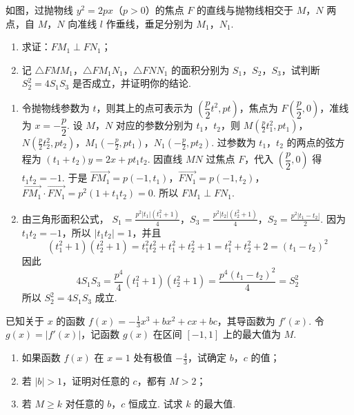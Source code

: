 \begin{problem}
如图，过抛物线 \( y^{2} = 2px \)（\(p > 0\)）的焦点 \(F\) 的直线与抛物线相交于 \(M\)，\(N\) 两点，自 \(M\)，\(N\) 向准线 \( l \) 作垂线，垂足分别为 \(M_{1}\)，\(N_{1}\).

\begin{enumerate}
\item 求证：\( FM_{1} \perp FN_{1} \)；
\item 记 \(\triangle FMM_{1}\)，\(\triangle FM_{1}N_{1}\)，\(\triangle FNN_{1}\) 的面积分别为 \(S_{1}\)，\(S_{2}\)，\(S_{3}\)，试判断 \(S_{2}^{2} = 4S_{1}S_{3}\) 是否成立，并证明你的结论.
\end{enumerate}

\end{problem}

\begin{solution}
\begin{enumerate}
\item 令抛物线参数为 \(t\)，则其上的点可表示为 \(\left(\dfrac{p}{2}t^2,pt\right)\)，焦点为 \(F\left(\dfrac{p}{2},0\right)\)，准线为 \(x=-\dfrac{p}{2}\). 设 \(M\)，\(N\) 对应的参数分别为 \(t_1\)，\(t_2\)，则
\(M\left(\frac{p}{2}t_1^2,pt_1\right)\)，\(N\left(\frac{p}{2}t_2^2,pt_2\right)\)，\(M_1\left(-\frac{p}{2},pt_1\right)\)，\(N_1\left(-\frac{p}{2},pt_2\right)\).
过参数为 \(t_1\)，\(t_2\) 的两点的弦方程为 \((t_1+t_2)y=2x+pt_1t_2\). 因直线 \(MN\) 过焦点 \(F\)，代入 \(\left(\dfrac{p}{2},0\right)\) 得 \(t_1t_2=-1\). 于是
\(\overrightarrow{FM_1}=p(-1,t_1)\)，\(\overrightarrow{FN_1}=p(-1,t_2)\)，\(\overrightarrow{FM_1}\cdot\overrightarrow{FN_1}=p^2(1+t_1t_2)=0\).
所以 \(FM_1\perp FN_1\).
\item 由三角形面积公式，
\(S_1=\frac{p^2|t_1|(t_1^2+1)}{4}\)，\(S_3=\frac{p^2|t_2|(t_2^2+1)}{4}\)，\(S_2=\frac{p^2|t_1-t_2|}{2}\).
因为 \(t_1t_2=-1\)，所以 \(|t_1t_2|=1\)，并且
\[
(t_1^2+1)(t_2^2+1)=t_1^2t_2^2+t_1^2+t_2^2+1=t_1^2+t_2^2+2=(t_1-t_2)^2
\]
因此
\[
4S_1S_3=\frac{p^4}{4}(t_1^2+1)(t_2^2+1)=\frac{p^4(t_1-t_2)^2}{4}=S_2^2
\]
所以 \(S_2^2=4S_1S_3\) 成立.
\end{enumerate}
\end{solution}

\begin{problem}
已知关于 \(x\) 的函数 \(f(x) = -\frac{1}{3} x^{3} + bx^{2} + cx + bc\)，其导函数为 \(f'(x)\). 令 \(g(x) = |f'(x)|\)，记函数 \(g(x)\) 在区间 \([-1,1]\) 上的最大值为 \(M\).

\begin{enumerate}
\item 如果函数 \( f(x) \) 在 \( x = 1 \) 处有极值 \( -\frac{4}{3} \)，试确定 \( b\)，\( c \) 的值；
\item 若 \( |b| > 1 \)，证明对任意的 \( c \)，都有 \( M > 2 \)；
\item 若 \(M \geqslant k\) 对任意的 \(b\)，\(c\) 恒成立. 试求 \(k\) 的最大值.
\end{enumerate}
\end{problem}

